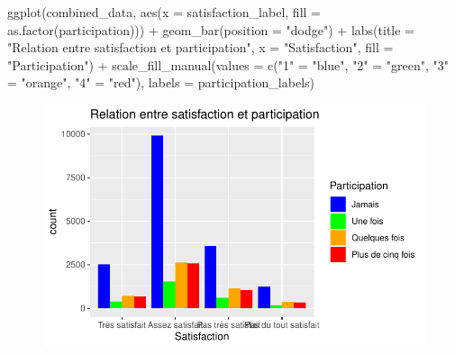 \documentclass[
  letterpaper,
  DIV=11,
  numbers=noendperiod]{scrartcl}
\newenvironment{Shaded}{\begin{snugshade}}{\end{snugshade}}
\newcommand{\AttributeTok}[1]{\textcolor[rgb]{0.40,0.45,0.13}{#1}}
\newcommand{\FunctionTok}[1]{\textcolor[rgb]{0.28,0.35,0.67}{#1}}
\newcommand{\NormalTok}[1]{\textcolor[rgb]{0.00,0.23,0.31}{#1}}
\newcommand{\OtherTok}[1]{\textcolor[rgb]{0.00,0.23,0.31}{#1}}
\newcommand{\SpecialCharTok}[1]{\textcolor[rgb]{0.37,0.37,0.37}{#1}}
\newcommand{\StringTok}[1]{\textcolor[rgb]{0.13,0.47,0.30}{#1}}
\begin{document}
\begin{Shaded}
\begin{Highlighting}[]
\FunctionTok{ggplot}\NormalTok{(combined\_data, }\FunctionTok{aes}\NormalTok{(}\AttributeTok{x =}\NormalTok{ satisfaction\_label, }\AttributeTok{fill =} \FunctionTok{as.factor}\NormalTok{(participation))) }\SpecialCharTok{+}
  \FunctionTok{geom\_bar}\NormalTok{(}\AttributeTok{position =} \StringTok{"dodge"}\NormalTok{) }\SpecialCharTok{+}
  \FunctionTok{labs}\NormalTok{(}\AttributeTok{title =} \StringTok{"Relation entre satisfaction et participation"}\NormalTok{,}
       \AttributeTok{x =} \StringTok{"Satisfaction"}\NormalTok{, }
       \AttributeTok{fill =} \StringTok{"Participation"}\NormalTok{) }\SpecialCharTok{+}
  \FunctionTok{scale\_fill\_manual}\NormalTok{(}\AttributeTok{values =} \FunctionTok{c}\NormalTok{(}\StringTok{"1"} \OtherTok{=} \StringTok{"blue"}\NormalTok{, }\StringTok{"2"} \OtherTok{=} \StringTok{"green"}\NormalTok{, }\StringTok{"3"} \OtherTok{=} \StringTok{"orange"}\NormalTok{, }\StringTok{"4"} \OtherTok{=} \StringTok{"red"}\NormalTok{),}
                    \AttributeTok{labels =}\NormalTok{ participation\_labels)}
\end{Highlighting}
\end{Shaded}

\begin{figure}[H]

{\centering \includegraphics{TP2Akyildiz_files/figure-pdf/unnamed-chunk-8-1.pdf}

}

\end{figure}
\end{document}
